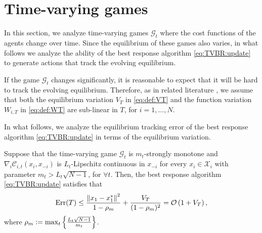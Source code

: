 \section{Time-varying games}\label{sec:TV_BR}
In this section, we analyze time-varying games $\mathcal{G}_t$ where the cost functions of the agents change over time. Since the equilibrium of these games also varies, in what follows we analyze the ability of the best response algorithm \eqref{eq:TVBR:update} to generate actions that track the evolving equilibrium. 

If the game $\mathcal{G}_t$ changes significantly, it is reasonable to expect that it will be hard to track the evolving equilibrium. Therefore, as in related literature \cite{duvocelle2022multiagent,zhang2022no}, we assume that both the equilibrium variation $V_T$ in \eqref{eq:def:VT} and the function variation $W_{i,T}$ in \eqref{eq:def:WT} are sub-linear in $T$, for $i=1,\ldots,N$.

In what follows, we analyze the equilibrium tracking error of the best response algorithm \eqref{eq:TVBR:update} in terms of the equilibrium variation.
\begin{theorem}\label{theorem:BRTV}
Suppose that the time-varying game $\mathcal{G}_t$ is $m_t$-strongly monotone and $\nabla_i \mathcal{C}_{i,t}(x_i,x_{-i})$ is $L_t$-Lipschitz continuous in $x_{-i}$ for every $x_i \in \mathcal{X}_i$ with parameter $m_t>L_t \sqrt{N-1}$, for $\forall t$. Then, the best response algorithm \eqref{eq:TVBR:update} satisfies that
\begin{align}\label{eq:BRTV:convergence}
    {\rm{Err}}(T) \leq \frac{\left\| x_{1}- x_{1}^{*}\right\|^2}{1-\rho_m} + \frac{V_T}{(1-\rho_m)^2}=\mathcal{O}\left( 1+ V_T\right),
\end{align}
where $\rho_m:= \mathop{\rm{max}}_t \left\{ \frac{L_t\sqrt{N-1}}{m_t} \right\}$.
\end{theorem}

